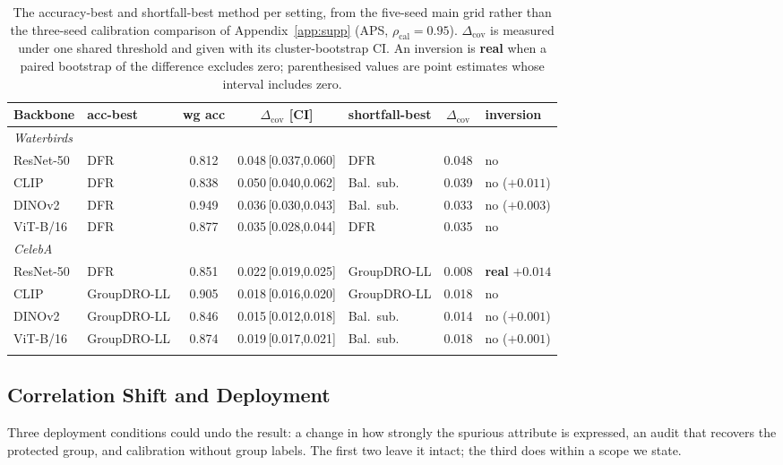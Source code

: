 \documentclass[pdflatex,sn-basic]{sn-jnl}%
\theoremstyle{thmstyleone}%
\newcommand{\cov}{\mathrm{cov}}
\newcommand{\covgap}{\Delta_{\cov}}
\newcommand{\rhocal}{\rho_{\mathrm{cal}}}
\begin{document}
\begin{table}[t]
\centering
\caption{The accuracy-best and shortfall-best method per setting, from the five-seed main grid rather than the three-seed calibration comparison of Appendix~\ref{app:supp} (APS, $\rhocal=0.95$). $\covgap$ is measured under one shared threshold and given with its cluster-bootstrap CI. An inversion is \textbf{real} when a paired bootstrap of the difference excludes zero; parenthesised values are point estimates whose interval includes zero.}
\label{tab:h2}
\footnotesize
\setlength{\tabcolsep}{3.5pt}
\begin{tabular}{llcclcl}
\toprule
Backbone & acc-best & wg acc & $\covgap$ [CI] & shortfall-best & $\covgap$ & inversion \\
\midrule
\multicolumn{7}{l}{\emph{Waterbirds}} \\
ResNet-50 & DFR & 0.812 & 0.048\,[0.037,0.060] & DFR & 0.048 & no \\
CLIP & DFR & 0.838 & 0.050\,[0.040,0.062] & Bal.\ sub. & 0.039 & no ($+0.011$) \\
DINOv2 & DFR & 0.949 & 0.036\,[0.030,0.043] & Bal.\ sub. & 0.033 & no ($+0.003$) \\
ViT-B/16 & DFR & 0.877 & 0.035\,[0.028,0.044] & DFR & 0.035 & no \\
\midrule
\multicolumn{7}{l}{\emph{CelebA}} \\
ResNet-50 & DFR & 0.851 & 0.022\,[0.019,0.025] & GroupDRO-LL & 0.008 & \textbf{real} $+0.014$ \\
CLIP & GroupDRO-LL & 0.905 & 0.018\,[0.016,0.020] & GroupDRO-LL & 0.018 & no \\
DINOv2 & GroupDRO-LL & 0.846 & 0.015\,[0.012,0.018] & Bal.\ sub. & 0.014 & no ($+0.001$) \\
ViT-B/16 & GroupDRO-LL & 0.874 & 0.019\,[0.017,0.021] & Bal.\ sub. & 0.018 & no ($+0.001$) \\
\botrule
\end{tabular}
\end{table}

\subsection{Correlation Shift and Deployment}
\label{sec:h3}

Three deployment conditions could undo the result: a change in how strongly the spurious
attribute is expressed, an audit that recovers the protected group, and calibration without group
labels. The first two leave it intact; the third does within a scope we state.
\end{document}
